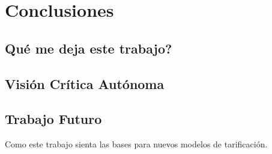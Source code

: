 \chapter{Conclusiones}
\section{Qu\'e me deja este trabajo?}

\section{Visi\'on Cr\'itica Aut\'onoma}

\section{Trabajo Futuro}
Como este trabajo sienta las bases para nuevos modelos de tarificaci\'on.